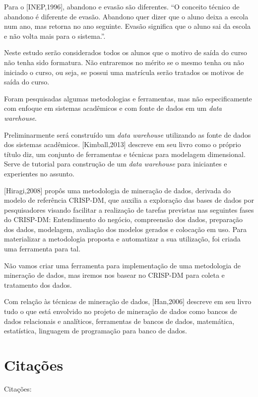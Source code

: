 Para o [INEP,1996], abandono e evasão são diferentes. “O conceito técnico de abandono é diferente de evasão. Abandono quer dizer que o aluno deixa a escola num ano, mas retorna no ano seguinte. Evasão significa que o aluno sai da escola e não volta mais para o sistema.”.

Neste estudo serão considerados todos os alunos que o motivo de saída do curso não tenha sido formatura. Não entraremos no mérito se o mesmo tenha ou não iniciado o curso, ou seja, se possui uma matrícula serão tratados os motivos de saída do curso.

Foram pesquisadas algumas metodologias e ferramentas,  mas não especificamente com enfoque em sistemas acadêmicos e com fonte de dados em um \textit{data warehouse}. 

Preliminarmente será construído um \textit{data warehouse} utilizando as fonte de dados dos sistemas acadêmicos. [Kimball,2013] %
descreve em seu livro como o próprio título diz, um conjunto de  ferramentas e técnicas para modelagem dimensional. Serve de tutorial para construção de um \textit{data warehouse} para iniciantes e experientes no assunto.

[Hiragi,2008] %
propôs uma metodologia de mineração de dados, derivada do modelo de referência CRISP-DM, que auxilia a exploração das bases de dados por pesquisadores visando facilitar a realização de tarefas previstas  nas seguintes fases do CRISP-DM: Entendimento do negócio, compreensão dos dados, preparação dos dados, modelagem, avaliação dos modelos gerados e colocação em uso.  Para materializar  a metodologia proposta e automatizar a sua utilização, foi criada uma ferramenta para tal.

Não vamos criar uma ferramenta para implementação de uma metodologia de mineração de dados, mas iremos nos basear no CRISP-DM para coleta e tratamento dos dados.

Com relação às técnicas de mineração de dados, [Han,2006] %
descreve em seu livro  tudo o que está envolvido no projeto de mineração de dados como bancos de dados relacionais e analíticos, ferramentas de bancos de dados, matemática, estatística, linguagem de programação para banco de dados.











\section{Citações}%
   Citações: 
   
